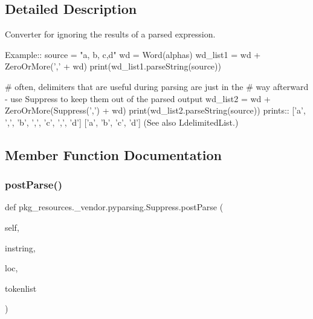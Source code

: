 \subsection{Detailed Description}
\begin{DoxyVerb}Converter for ignoring the results of a parsed expression.

Example::
    source = "a, b, c,d"
    wd = Word(alphas)
    wd_list1 = wd + ZeroOrMore(',' + wd)
    print(wd_list1.parseString(source))

    # often, delimiters that are useful during parsing are just in the
    # way afterward - use Suppress to keep them out of the parsed output
    wd_list2 = wd + ZeroOrMore(Suppress(',') + wd)
    print(wd_list2.parseString(source))
prints::
    ['a', ',', 'b', ',', 'c', ',', 'd']
    ['a', 'b', 'c', 'd']
(See also L{delimitedList}.)
\end{DoxyVerb}
 

\subsection{Member Function Documentation}
\mbox{\label{classpkg__resources_1_1__vendor_1_1pyparsing_1_1Suppress_a65fa22954f7a5a732fcd5632839a8936}} 
\subsubsection{\texorpdfstring{post\+Parse()}{postParse()}}
{\footnotesize\ttfamily def pkg\+\_\+resources.\+\_\+vendor.\+pyparsing.\+Suppress.\+post\+Parse (\begin{DoxyParamCaption}\item[{}]{self,  }\item[{}]{instring,  }\item[{}]{loc,  }\item[{}]{tokenlist }\end{DoxyParamCaption})}

\mbox{\label{classpkg__resources_1_1__vendor_1_1pyparsing_1_1Suppress_a66979fab93dbde807d28890e54de5fcc}} 
